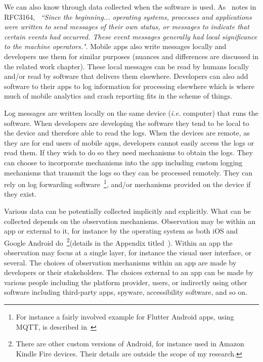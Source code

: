 We can also know through data collected when the software is used. As~\cite{RFC3164} notes in RFC3164, ~\emph{``Since the beginning... operating systems, processes and applications were written to send messages of their own status, or messages to indicate that certain events had occurred. These event messages generally had local significance to the machine operators."}. Mobile apps also write messages locally and developers use them for similar purposes (nuances and differences are discussed in the related work chapter). These local messages can be read by humans locally and/or read by software that delivers them elsewhere. Developers can also add software to their apps to log information for processing elsewhere which is where much of mobile analytics and crash reporting fits in the scheme of things.

Log messages are written locally on the same device (\textit{i.e.} computer) that runs the software. When developers are developing the software they tend to be local to the device and therefore able to read the logs. When the devices are remote, as they are for end users of mobile apps, developers cannot easily access the logs or read them. If they wish to do so they need mechanisms to obtain the logs. They can choose to incorporate mechanisms into the app including custom logging mechanisms that transmit the logs so they can be processed remotely. They can rely on log forwarding software~\footnote{For instance a fairly involved example for Flutter Android apps, using MQTT, is described in~\citep{adil2020_sending_logs_from_flutter_apps}}, and/or mechanisms provided on the device if they exist. 


Various data can be potentially collected implicitly and explicitly. What can be collected depends on the observation mechanisms. Observation may be within an app or external to it, for instance by the operating system as both iOS  and Google Android do~\footnote{There are other custom versions of Android, for instance used in Amazon Kindle Fire devices. Their details are outside the scope of my research.}(details in the Appendix titled~\href{chapter-on-mobile-analytics}{\emph{}}). Within an app the observation may focus at a single layer, for instance the visual user interface, or several. The choices of observation mechanisms within an app are made by developers or their stakeholders. The choices external to an app can be made by various people including the platform provider, users, or indirectly using other software including third-party apps, spyware, accessibility software, and so on.

